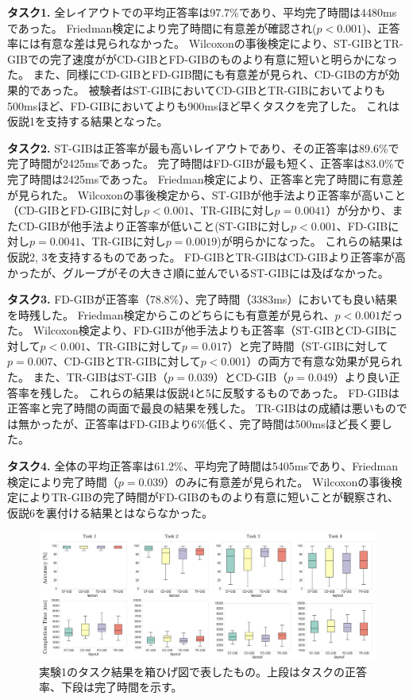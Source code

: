 \documentclass{kuee}
\begin{document}
{\bf タスク1.} 全レイアウトでの平均正答率は97.7\%であり、平均完了時間は4480msであった。
Friedman検定により完了時間に有意差が確認され($p < 0.001$)、正答率には有意な差は見られなかった。
Wilcoxonの事後検定により、ST-GIBとTR-GIBでの完了速度ががCD-GIBとFD-GIBのものより有意に短いと明らかになった。
また、同様にCD-GIBとFD-GIB間にも有意差が見られ、CD-GIBの方が効果的であった。
被験者はST-GIBにおいてCD-GIBとTR-GIBにおいてよりも500msほど、FD-GIBにおいてよりも900msほど早くタスクを完了した。
これは仮説1を支持する結果となった。

{\bf タスク2.} ST-GIBは正答率が最も高いレイアウトであり、その正答率は89.6\%で完了時間が2425msであった。
完了時間はFD-GIBが最も短く、正答率は83.0\%で完了時間は2425msであった。
Friedman検定により、正答率と完了時間に有意差が見られた。
Wilcoxonの事後検定から、ST-GIBが他手法より正答率が高いこと（CD-GIBとFD-GIBに対し$p<0.001$、TR-GIBに対し$p=0.0041$）が分かり、またCD-GIBが他手法より正答率が低いこと(ST-GIBに対し$p<0.001$、FD-GIBに対し$p=0.0041$、TR-GIBに対し$p=0.0019$)が明らかになった。
これらの結果は仮説2, 3を支持するものであった。
FD-GIBとTR-GIBはCD-GIBより正答率が高かったが、グループがその大きさ順に並んでいるST-GIBには及ばなかった。

{\bf タスク3.} FD-GIBが正答率（78.8\%）、完了時間（3383ms）においても良い結果を時残した。
Friedman検定からこのどちらにも有意差が見られ、$p<0.001$だった。
Wilcoxon検定より、FD-GIBが他手法よりも正答率（ST-GIBとCD-GIBに対して$p<0.001$、TR-GIBに対して$p=0.017$）と完了時間（ST-GIBに対して$p=0.007$、CD-GIBとTR-GIBに対して$p<0.001$）の両方で有意な効果が見られた。
また、TR-GIBはST-GIB（$p=0.039$）とCD-GIB（$p=0.049$）より良い正答率を残した。
これらの結果は仮説4と5に反駁するものであった。
FD-GIBは正答率と完了時間の両面で最良の結果を残した。
TR-GIBはの成績は悪いものでは無かったが、正答率はFD-GIBより6\%低く、完了時間は500msほど長く要した。

{\bf タスク4.} 全体の平均正答率は61.2\%、平均完了時間は5405msであり、Friedman検定により完了時間（$p=0.039$）のみに有意差が見られた。
Wilcoxonの事後検定によりTR-GIBの完了時間がFD-GIBのものより有意に短いことが観察され、仮説6を裏付ける結果とはならなかった。


\begin{figure}
  \centering
  \label{fig:result_ex1}
  \includegraphics[width=15cm]{./images/8sta.png}
  \caption{実験1のタスク結果を箱ひげ図で表したもの。上段はタスクの正答率、下段は完了時間を示す。}
\end{figure}
\end{document}
